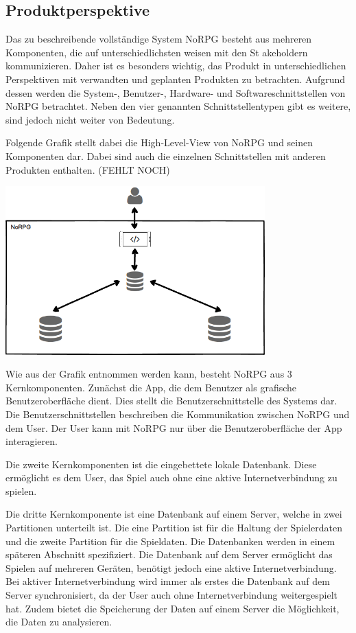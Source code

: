	\subsection{Produktperspektive}
		Das zu beschreibende vollständige System NoRPG besteht aus mehreren Komponenten, die auf unterschiedlichsten weisen mit den St akeholdern kommunizieren. Daher ist es besonders wichtig, das Produkt in unterschiedlichen Perspektiven mit verwandten und geplanten Produkten zu betrachten. Aufgrund dessen werden die System-, Benutzer-, Hardware- und Softwareschnittstellen von NoRPG betrachtet. Neben den vier genannten Schnittstellentypen gibt es weitere, sind jedoch nicht weiter von Bedeutung.
		
		Folgende Grafik stellt dabei die High-Level-View von NoRPG und seinen Komponenten dar. Dabei sind auch die einzelnen Schnittstellen mit anderen Produkten enthalten. (FEHLT NOCH)
		
		\begin{center}
			\includegraphics[width=10cm]{pics/HighLevelView.png}
		\end{center}
		
		Wie aus der Grafik entnommen werden kann, besteht NoRPG aus 3 Kernkomponenten. Zunächst die App, die dem Benutzer als grafische Benutzeroberfläche dient. Dies stellt die Benutzerschnittstelle des Systems dar. Die Benutzerschnittstellen beschreiben die Kommunikation zwischen NoRPG und dem User. Der User kann mit NoRPG nur über die Benutzeroberfläche der App interagieren.
		
		Die zweite Kernkomponenten ist die eingebettete lokale Datenbank. Diese ermöglicht es dem User, das Spiel auch ohne eine aktive Internetverbindung zu spielen.

		Die dritte Kernkomponente ist eine Datenbank auf einem Server, welche in zwei Partitionen unterteilt ist. Die eine Partition ist für die Haltung der Spielerdaten und die zweite Partition für die Spieldaten. Die Datenbanken werden in einem späteren Abschnitt spezifiziert. Die Datenbank auf dem Server ermöglicht das Spielen auf mehreren Geräten, benötigt jedoch eine aktive Internetverbindung. Bei aktiver Internetverbindung wird immer als erstes die Datenbank auf dem Server synchronisiert, da der User auch ohne Internetverbindung weitergespielt hat. Zudem bietet die Speicherung der Daten auf einem Server die Möglichkeit, die Daten zu analysieren.
		
